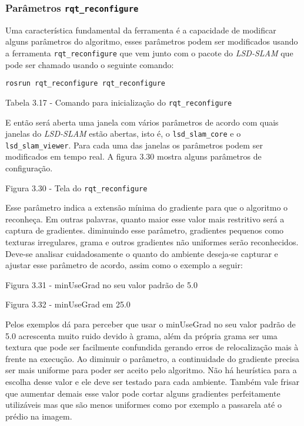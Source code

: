 \subsubsection{Parâmetros \texttt{rqt\_reconfigure}}

Uma característica fundamental da ferramenta é a capacidade de modificar alguns parâmetros do algoritmo, esses parâmetros podem ser modificados usando a ferramenta \texttt{rqt\_reconfigure} que vem junto com o pacote do \textit{LSD-SLAM} que pode ser chamado usando o seguinte comando:

\texttt{rosrun rqt\_reconfigure rqt\_reconfigure}

Tabela 3.17 - Comando para inicialização do \texttt{rqt\_reconfigure}

E então será aberta uma janela com vários parâmetros de acordo com quais janelas do \textit{LSD-SLAM} estão abertas, isto é, o \texttt{lsd\_slam\_core} e o \texttt{lsd\_slam\_viewer}. Para cada uma das janelas os parâmetros podem ser modificados em tempo real. A figura 3.30 mostra alguns parâmetros de configuração.

Figura 3.30 - Tela do \texttt{rqt\_reconfigure}


Esse parâmetro indica a extensão mínima do gradiente para que o algoritmo o reconheça. Em outras palavras, quanto maior esse valor mais restritivo será a captura de gradientes. diminuindo esse parâmetro, gradientes pequenos como texturas irregulares, grama e outros gradientes não uniformes serão reconhecidos. Deve-se analisar cuidadosamente o quanto do ambiente deseja-se capturar e ajustar esse parâmetro de acordo, assim como o exemplo a seguir:


Figura 3.31 - minUseGrad no seu valor padrão de 5.0

Figura 3.32 - minUseGrad em 25.0

Pelos exemplos dá para perceber que usar o minUseGrad no seu valor padrão de 5.0 acrescenta muito ruido devido à grama, além da própria grama ser uma textura que pode ser facilmente confundida gerando erros de relocalização mais à frente na execução. Ao diminuir o parâmetro, a continuidade do gradiente precisa ser mais uniforme para poder ser aceito pelo algoritmo. Não há heurística para a escolha desse valor e ele deve ser testado para cada ambiente. Também vale frisar que aumentar demais esse valor pode cortar alguns gradientes perfeitamente utilizáveis mas que são menos uniformes como por exemplo a passarela até o prédio na imagem.

